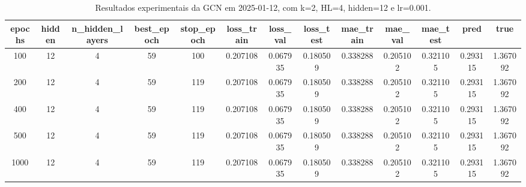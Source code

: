 \begin{table}[h]
\centering
\caption{Resultados experimentais da GCN em 2025-01-12, com k=2, HL=4, hidden=12 e lr=0.001.}
\label{tab:gcn_results_k2_hl4_h12_d20250112}
\begin{tabular}{ccccccccccccc}
\toprule
epochs & hidden & n\_hidden\_layers & best\_epoch & stop\_epoch & loss\_train & loss\_val & loss\_test & mae\_train & mae\_val & mae\_test & pred & true \\
\midrule
100 & 12 & 4 & 59 & 100 & 0.207108 & 0.067935 & 0.180509 & 0.338288 & 0.205102 & 0.321105 & 0.293115 & 1.367092 \\
200 & 12 & 4 & 59 & 119 & 0.207108 & 0.067935 & 0.180509 & 0.338288 & 0.205102 & 0.321105 & 0.293115 & 1.367092 \\
400 & 12 & 4 & 59 & 119 & 0.207108 & 0.067935 & 0.180509 & 0.338288 & 0.205102 & 0.321105 & 0.293115 & 1.367092 \\
500 & 12 & 4 & 59 & 119 & 0.207108 & 0.067935 & 0.180509 & 0.338288 & 0.205102 & 0.321105 & 0.293115 & 1.367092 \\
1000 & 12 & 4 & 59 & 119 & 0.207108 & 0.067935 & 0.180509 & 0.338288 & 0.205102 & 0.321105 & 0.293115 & 1.367092 \\
\bottomrule
\end{tabular}
\end{table}
